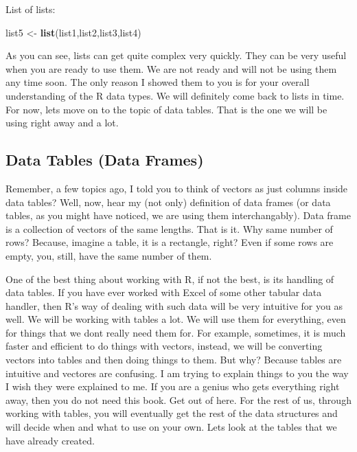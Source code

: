 \documentclass[]{book}
\newenvironment{Shaded}{\begin{snugshade}}{\end{snugshade}}
\newcommand{\KeywordTok}[1]{\textcolor[rgb]{0.13,0.29,0.53}{\textbf{#1}}}
\newcommand{\NormalTok}[1]{#1}
\newcommand{\StringTok}[1]{\textcolor[rgb]{0.31,0.60,0.02}{#1}}
\begin{document}
List of lists:

\begin{Shaded}
\begin{Highlighting}[]
\NormalTok{list5 <-}\StringTok{ }\KeywordTok{list}\NormalTok{(list1,list2,list3,list4)}
\end{Highlighting}
\end{Shaded}

As you can see, lists can get quite complex very quickly. They can be very useful when you are ready to use them. We are not ready and will not be using them any time soon. The only reason I showed them to you is for your overall understanding of the R data types. We will definitely come back to lists in time. For now, lets move on to the topic of data tables. That is the one we will be using right away and a lot.

\hypertarget{data-tables-data-frames}{%
\subsection{Data Tables (Data Frames)}\label{data-tables-data-frames}}

Remember, a few topics ago, I told you to think of vectors as just columns inside data tables? Well, now, hear my (not only) definition of data frames (or data tables, as you might have noticed, we are using them interchangably). Data frame is a collection of vectors of the same lengths. That is it. Why same number of rows? Because, imagine a table, it is a rectangle, right? Even if some rows are empty, you, still, have the same number of them.

One of the best thing about working with R, if not the best, is its handling of data tables. If you have ever worked with Excel of some other tabular data handler, then R's way of dealing with such data will be very intuitive for you as well. We will be working with tables a lot. We will use them for everything, even for things that we dont really need them for. For example, sometimes, it is much faster and efficient to do things with vectors, instead, we will be converting vectors into tables and then doing things to them. But why? Because tables are intuitive and vectores are confusing. I am trying to explain things to you the way I wish they were explained to me. If you are a genius who gets everything right away, then you do not need this book. Get out of here. For the rest of us, through working with tables, you will eventually get the rest of the data structures and will decide when and what to use on your own. Lets look at the tables that we have already created.
\end{document}
